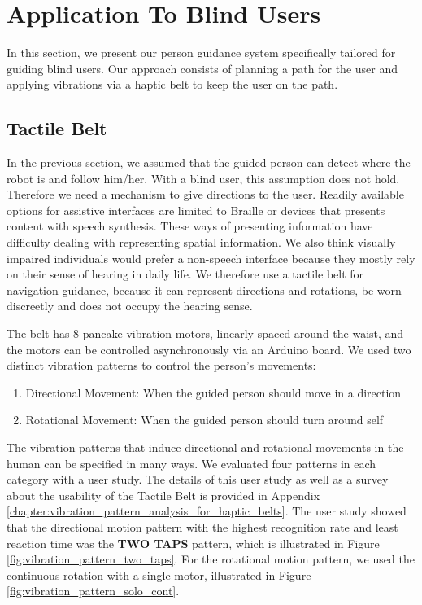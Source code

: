 \section{Application To Blind Users}
\label{sec:guidance_blind_users}

In this section, we present our person guidance system specifically tailored for guiding blind users. Our approach consists of planning a path for the user and applying vibrations via a haptic belt to keep the user on the path.


\subsection{Tactile Belt}

In the previous section, we assumed that the guided person can detect where the robot is and follow him/her. With a blind user, this assumption does not hold. Therefore we need a mechanism to give directions to the user. Readily available options for assistive interfaces are limited to Braille or devices that presents content with speech synthesis. These ways of presenting information have difficulty dealing with representing spatial information. We also think visually impaired individuals would prefer a non-speech interface because they mostly rely on their sense of hearing in daily life. We therefore use a tactile belt for navigation guidance, because it can represent directions and rotations, be worn discreetly and does not occupy the hearing sense.

The belt has 8 pancake vibration motors, linearly spaced around the waist, and the motors can be controlled asynchronously via an Arduino board. We used two distinct vibration patterns to control the person's movements:

\begin{enumerate}
\item Directional Movement: When the guided person should move in a direction
\item Rotational Movement: When the guided person should turn around self
\end{enumerate}

The vibration patterns that induce directional and rotational movements in the human can be specified in many ways. We evaluated four patterns in each category with a user study. The details of this user study as well as a survey about the usability of the Tactile Belt is provided in Appendix \ref{chapter:vibration_pattern_analysis_for_haptic_belts}. The user study showed that the directional motion pattern with the highest recognition rate and least reaction time was the \textbf{TWO TAPS} pattern, which is illustrated in Figure \ref{fig:vibration_pattern_two_taps}. For the rotational motion pattern, we used the continuous rotation with a single motor, illustrated in Figure \ref{fig:vibration_pattern_solo_cont}. 

